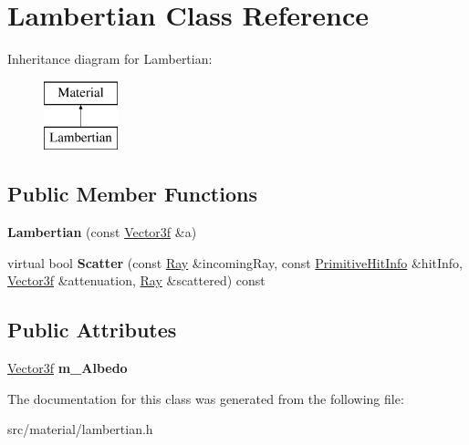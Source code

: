 \hypertarget{class_lambertian}{}\section{Lambertian Class Reference}
\label{class_lambertian}
Inheritance diagram for Lambertian\+:\begin{figure}[H]
\begin{center}
\leavevmode
\includegraphics[height=2.000000cm]{class_lambertian}
\end{center}
\end{figure}
\subsection*{Public Member Functions}
\begin{DoxyCompactItemize}
\item 
\mbox{\label{class_lambertian_ad251ed0d49448691225dcdf0436ed3e3}} 
{\bfseries Lambertian} (const \mbox{\hyperlink{class_vector3}{Vector3f}} \&a)
\item 
\mbox{\label{class_lambertian_aa095b7cab838194625e7cc4114f52855}} 
virtual bool {\bfseries Scatter} (const \mbox{\hyperlink{class_ray}{Ray}} \&incoming\+Ray, const \mbox{\hyperlink{struct_primitive_hit_info}{Primitive\+Hit\+Info}} \&hit\+Info, \mbox{\hyperlink{class_vector3}{Vector3f}} \&attenuation, \mbox{\hyperlink{class_ray}{Ray}} \&scattered) const
\end{DoxyCompactItemize}
\subsection*{Public Attributes}
\begin{DoxyCompactItemize}
\item 
\mbox{\label{class_lambertian_a1f9b155c521364c915fa4a984ea68117}} 
\mbox{\hyperlink{class_vector3}{Vector3f}} {\bfseries m\+\_\+\+Albedo}
\end{DoxyCompactItemize}


The documentation for this class was generated from the following file\+:\begin{DoxyCompactItemize}
\item 
src/material/lambertian.\+h\end{DoxyCompactItemize}
